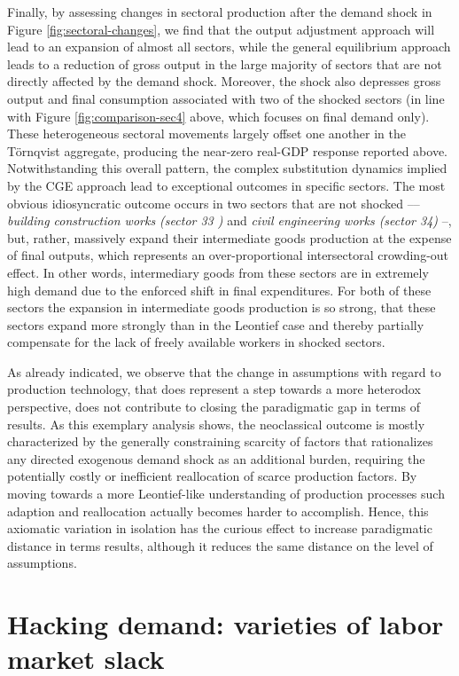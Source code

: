 \documentclass{article}
\begin{document}
Finally, by assessing changes in sectoral production after the demand shock in Figure \ref{fig:sectoral-changes}, we find that the output adjustment approach will lead to an expansion of almost all sectors, while the general equilibrium approach leads to a reduction of gross output in the large majority of sectors that are not directly affected by the demand shock. Moreover, the shock also depresses gross output and final consumption associated with two of the shocked sectors (in line with Figure \ref{fig:comparison-sec4} above, which focuses on final demand only). These heterogeneous sectoral movements largely offset one another in the T\"ornqvist aggregate, producing the near-zero real-GDP response reported above. Notwithstanding this overall pattern, the complex substitution dynamics implied by the CGE approach lead to exceptional outcomes in specific sectors. The most obvious idiosyncratic outcome occurs in two sectors that are not shocked –– \textit{building construction works (sector 33 )} and \textit{civil engineering works (sector 34)} --, but, rather, massively expand their intermediate goods production at the expense of final outputs, which represents an over-proportional intersectoral crowding-out effect. In other words, intermediary goods from these sectors are in extremely high demand due to the enforced shift in final expenditures. For both of these sectors the expansion in intermediate goods production is so strong, that these sectors expand more strongly than in the Leontief case and thereby partially compensate for the lack of freely available workers in shocked sectors.

As already indicated, we observe that the change in assumptions with regard to production technology, that does represent a step towards a more heterodox perspective, does not contribute to closing the paradigmatic gap in terms of results. As this exemplary analysis shows, the neoclassical outcome is mostly characterized by the generally constraining scarcity of factors that rationalizes any directed exogenous demand shock as an additional burden, requiring the potentially costly or inefficient reallocation of scarce production factors. By moving towards a more Leontief-like understanding of production processes such adaption and reallocation actually becomes harder to accomplish. Hence, this axiomatic variation in isolation has the curious effect to increase paradigmatic distance in terms results, although it reduces the same distance on the level of assumptions.

\section{Hacking demand: varieties of labor market slack} \label{sec:labor}
\end{document}
